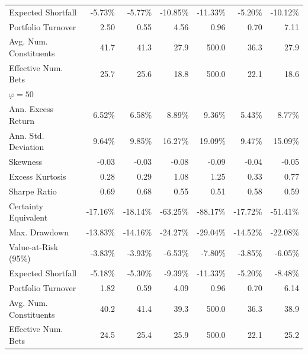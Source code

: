 \begin{tabular*}{\textwidth}{l@{\extracolsep{\fill}}rrrrrr}
Expected Shortfall & -5.73\% & -5.77\% & -10.85\% & -11.33\% & -5.20\% & -10.12\% \\
Portfolio Turnover & 2.50 & 0.55 & 4.56 & 0.96 & 0.70 & 7.11 \\
Avg. Num. Constituents & 41.7 & 41.3 & 27.9 & 500.0 & 36.3 & 27.9 \\
Effective Num. Bets & 25.7 & 25.6 & 18.8 & 500.0 & 22.1 & 18.6 \\
\midrule
\multicolumn{7}{l}{\textit{$\varphi = 50$}} \\
\midrule
Ann. Excess Return & 6.52\% & 6.58\% & 8.89\% & 9.36\% & 5.43\% & 8.77\% \\
Ann. Std. Deviation & 9.64\% & 9.85\% & 16.27\% & 19.09\% & 9.47\% & 15.09\% \\
Skewness & -0.03 & -0.03 & -0.08 & -0.09 & -0.04 & -0.05 \\
Excess Kurtosis & 0.28 & 0.29 & 1.08 & 1.25 & 0.33 & 0.77 \\
Sharpe Ratio & 0.69 & 0.68 & 0.55 & 0.51 & 0.58 & 0.59 \\
Certainty Equivalent & -17.16\% & -18.14\% & -63.25\% & -88.17\% & -17.72\% & -51.41\% \\
Max. Drawdown & -13.83\% & -14.16\% & -24.27\% & -29.04\% & -14.52\% & -22.08\% \\
Value-at-Risk (95\%) & -3.83\% & -3.93\% & -6.53\% & -7.80\% & -3.85\% & -6.05\% \\
Expected Shortfall & -5.18\% & -5.30\% & -9.39\% & -11.33\% & -5.20\% & -8.48\% \\
Portfolio Turnover & 1.82 & 0.59 & 4.09 & 0.96 & 0.70 & 6.14 \\
Avg. Num. Constituents & 40.2 & 41.4 & 39.3 & 500.0 & 36.3 & 38.9 \\
Effective Num. Bets & 24.5 & 25.4 & 25.9 & 500.0 & 22.1 & 25.2 \\
\bottomrule
\end{tabular*}

